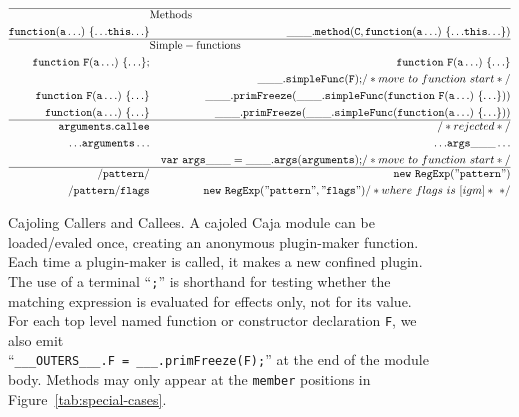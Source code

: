 \documentclass[letterpaper,twocolumn,10pt]{article}
\newcommand{\code}[1]{{\tt {#1}}}              %
\begin{document}
\begin{figure}
\begin{eqnarray}
  \hline
   \nonumber & \lefteqn{\mathrm{Methods}} & \\
  \code{function(a\ldots)\ \{{\ldots}this{\ldots}\}}         
             & \label{member:method}  & \code{\_\_\_.method(C,function(a\ldots)\ \{{\ldots}this{\ldots}\})} \\
  \hline
   \nonumber & \lefteqn{\mathrm{Simple-functions}} & \\
  \code{function\ F(a\ldots)\ \{{\ldots}\};} 
             & \label{func:named-decl} & \code{function\ F(a\ldots)\ \{{\ldots}\}} \\
             & \nonumber               & \code{\_\_\_.simpleFunc(F);} /*move\ to\ function\ start*/ \\
  \code{function\ F(a\ldots)\ \{{\ldots}\}}      
             & \label{func:named-expr}
                                 & \code{\_\_\_.primFreeze(\_\_\_.simpleFunc(function\ F(a\ldots)\ \{{\ldots}\}))} \\
  \code{function(a\ldots)\ \{{\ldots}\}}         
             & \label{func:anon} & \code{\_\_\_.primFreeze(\_\_\_.simpleFunc(function(a\ldots)\ \{{\ldots}\}))} \\ 
  \hline
  \code{arguments.callee} 
             & \label{read:bad-callee} & /*rejected*/ \\
  \code{{\ldots}arguments\ldots} 
             & \label{read:args}   & \code{{\ldots}args\_\_\_\ldots} \\
             & \nonumber           & \code{var\ args\_\_\_ = \_\_\_.args(arguments);} /*move\ to\ function\ start*/\\ 
  \hline
  \code{/pattern/}      & \label{pattern:unary}                 & \code{new\ RegExp("pattern")} \\
  \code{/pattern/flags} & \label{pattern:binary}
                                   & \code{new\ RegExp("pattern", "flags")} /*where\ flags\ is\ [igm]*\ */
\end{eqnarray}

\caption[Cajoling Callers and Callees]{Cajoling Callers and Callees. A 
cajoled Caja module can be loaded/evaled once, creating an anonymous 
plugin-maker function. Each time a plugin-maker is called, it makes a new 
confined plugin. The use of a terminal ``\code{;}'' is shorthand for testing 
whether the matching expression is evaluated for effects only, not for its 
value. For each top level named function or constructor declaration \code{F}, we 
also emit \\
``\code{\_\_\_OUTERS\_\_\_.F = \_\_\_.primFreeze(F);}'' at the end of the 
module body. Methods may only appear at the \code{member} positions in 
Figure~\ref{tab:special-cases}.}
\label{tab:call-xlate}
\end{figure}
\end{document}
